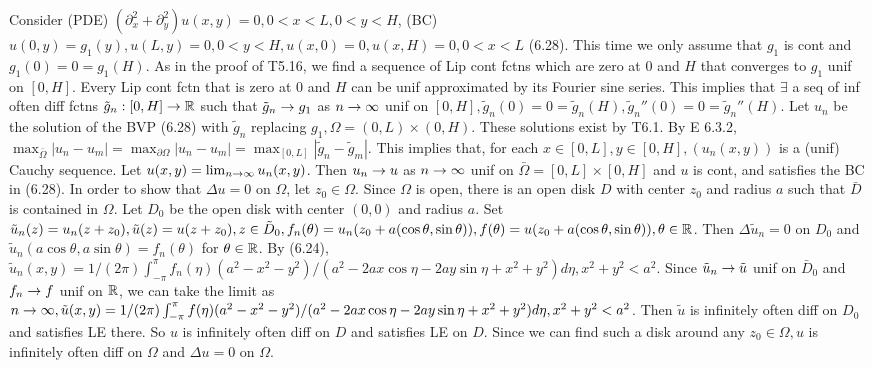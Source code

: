Consider (PDE) $(\partial_x^2 + \partial_y^2)u(x,y) = 0, 0 < x < L, 0 < y < H$, (BC) $u(0,y) = g_1(y), u(L,y)=0, 0 < y < H, u(x,0)=0, u(x,H) = 0, 0 < x < L$ (6.28). This time we only assume that $g_1$ is cont and $g_1(0) = 0 = g_1(H)$. As in the proof of T5.16, we find a sequence of Lip cont fctns which are zero at 0 and $H$ that converges to $g_1$ unif on $[0, H]$. Every Lip cont fctn that is zero at 0 and $H$ can be unif approximated by its Fourier sine series.  This implies that $\exists$ a seq of inf often diff fctns $\tilde{g}_n : [0, H] \rightarrow \mathbb{R}$ such that $\tilde{g}_n \rightarrow g_1$ as $n \rightarrow \infty$ unif on $[0, H], \tilde{g}_n(0) = 0 = \tilde{g}_n (H), \tilde{g}_n''(0) = 0 = \tilde{g}_n''(H)$. Let $u_n$ be the solution of the BVP (6.28) with $\tilde{g}_n$ replacing $g_1, \Omega = (0,L) \times (0, H)$. These solutions exist by T6.1.  By E 6.3.2, $\max_{\bar{\Omega}} |u_n - u_m| = \max_{\partial \Omega} |u_n - u_m| = \max_{[0,L]} |\tilde{g}_n - \tilde{g}_m|$. This implies that, for each $x \in [0, L], y \in [0, H], (u_n(x,y))$ is a (unif) Cauchy sequence.  Let $u(x,y) = \lim_{n \rightarrow \infty} u_n(x,y)$. Then $u_n \rightarrow u$ as $n \rightarrow \infty$ unif on $\bar{\Omega} = [0, L] \times [0, H]$ and $u$ is cont, and satisfies the BC in (6.28).  In order to show that $\Delta u = 0$ on $\Omega$, let $z_0 \in \Omega$. Since $\Omega$ is open, there is an open disk $D$ with center $z_0$ and radius $a$ such that $\bar{D}$ is contained in $\Omega$. Let $D_0$ be the open disk with center $(0, 0)$ and radius $a$. Set $\tilde{u}_n(z) = u_n(z + z_0), \tilde{u}(z) = u(z + z_0), z \in \tilde{D}_0, f_n(\theta) = u_n (z_0 + a (\cos \theta, \sin \theta)), f(\theta) = u(z_0 + a (\cos \theta, \sin \theta)), \theta \in \mathbb{R}$. Then $\Delta \tilde{u}_n = 0$ on $D_0$ and $\tilde{u}_n (a \cos \theta, a \sin \theta) = f_n(\theta)$ for $\theta \in \mathbb{R}$. By (6.24), $\tilde{u}_n(x,y) = 1/(2 \pi) \int_{-\pi}^{\pi} f_n (\eta) (a^2 - x^2 - y^2)/(a^2 - 2 a x \cos \eta - 2 a y \sin \eta + x^2 + y^2)d \eta, x^2 + y^2 < a^2$. Since $\tilde{u}_n \rightarrow \tilde{u}$ unif on $\bar{D}_0$ and $f_n \rightarrow f$ unif on $\mathbb{R}$, we can take the limit as $n \rightarrow \infty, \tilde{u}(x,y) = 1/(2 \pi) \int_{-\pi}^{\pi} f (\eta) (a^2 - x^2 - y^2)/(a^2 - 2 a x \cos \eta - 2 a y \sin \eta + x^2 + y^2)d \eta, x^2 + y^2 < a^2$. Then $\tilde{u}$ is infinitely often diff on $D_0$ and satisfies LE there. So $u$ is infinitely often diff on $D$ and satisfies LE on $D$. Since we can find such a disk around any $z_0 \in \Omega, u$ is infinitely often diff on $\Omega$ and $\Delta u = 0$ on $\Omega$.
